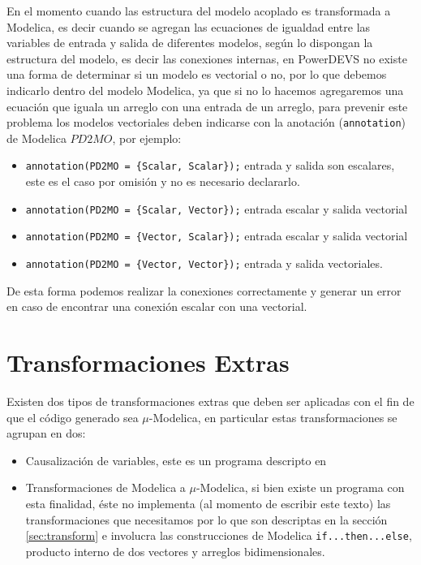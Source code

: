 	En el momento cuando las estructura del modelo acoplado es transformada a Modelica, es decir cuando se agregan las ecuaciones de igualdad entre las
	variables de entrada y salida de diferentes modelos, según lo dispongan la estructura del modelo, es decir las conexiones internas, en PowerDEVS 
	no existe una forma de determinar si un modelo es vectorial o no, por lo que debemos indicarlo dentro del modelo Modelica, ya que si no lo hacemos 
	agregaremos una ecuación que iguala un arreglo con una entrada de un arreglo, para prevenir este problema los modelos vectoriales deben indicarse 
	con la anotación (\texttt{annotation}) de Modelica $PD2MO$, por ejemplo:

\begin{itemize}
	\item \texttt{annotation(PD2MO = \{Scalar, Scalar\});} entrada y salida son escalares, este es el caso por omisión y no es necesario declararlo.
	\item \texttt{annotation(PD2MO = \{Scalar, Vector\});} entrada escalar y salida vectorial
	\item \texttt{annotation(PD2MO = \{Vector, Scalar\});} entrada escalar y salida vectorial
	\item \texttt{annotation(PD2MO = \{Vector, Vector\});} entrada y salida vectoriales.
\end{itemize}

	De esta forma podemos realizar la conexiones correctamente y generar un error en caso de encontrar una conexión escalar con una vectorial. 

\section{Transformaciones Extras}
	
	Existen dos tipos de transformaciones extras que deben ser aplicadas con el fin de que el código generado sea $\mu$-Modelica, en particular 
	estas transformaciones se agrupan en dos:
	\begin{itemize}
	\item Causalización de variables, este es un programa descripto en \cite{Mod15}
	\item Transformaciones de Modelica a $\mu$-Modelica, si bien existe un programa con esta finalidad, éste no implementa (al momento de escribir este texto)
	las transformaciones que necesitamos por lo que son descriptas en la sección \ref{sec:transform} e involucra las construcciones de Modelica 
		\texttt{if...then...else}, producto interno de dos vectores y arreglos bidimensionales.
	\end{itemize}

